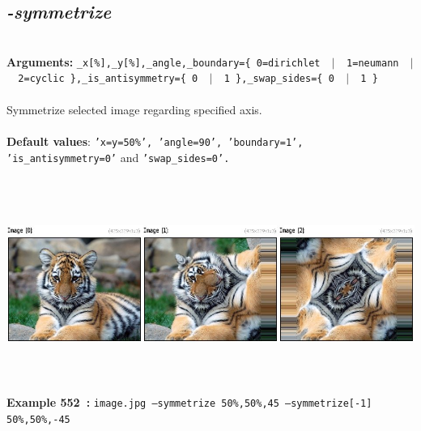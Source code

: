 \documentclass[a4paper,11pt,twoside]{book}
\begin{document}
\subsection{\emph{-symmetrize} }\vspace*{-0.5em}
~\\\textbf{Arguments: } 
{\small \texttt{\_x[\%],\_y[\%],\_angle,\_boundary=\{ 0=dirichlet ~$|$~ 1=neumann ~$|$~ 2=cyclic \},\_is\_antisymmetry=\{ 0 ~$|$~ 1 \},\_swap\_sides=\{ 0 ~$|$~ 1 \}}}\\~\\
Symmetrize selected image regarding specified axis.
~\\~\\\textbf{Default values}: {\small \texttt{'x=y=50\%', 'angle=90', 'boundary=1', 'is\_antisymmetry=0'} and \texttt{'swap\_sides=0'.}}
\begin{center}\includegraphics[keepaspectratio=true,height=7cm,width=\textwidth]{img/gmic_def552.jpg}\\
{\footnotesize \textbf{Example 552~:} \texttt{image.jpg --symmetrize 50\%,50\%,45 --symmetrize[-1] 50\%,50\%,-45}}
\end{center}
\end{document}
